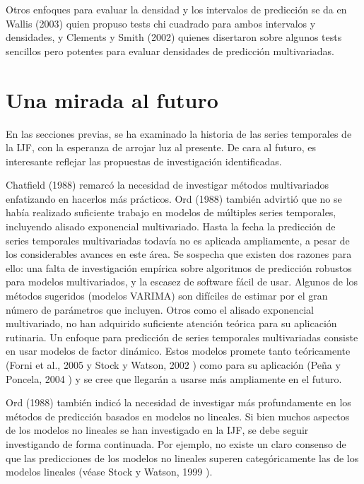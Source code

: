 \documentclass{llncs}
\begin{document}
Otros enfoques para evaluar la densidad y los intervalos de predicción se da en Wallis (2003) \cite{Wallis2003165} quien propuso tests chi cuadrado para ambos intervalos y densidades, y Clements y Smith (2002) quienes disertaron sobre algunos tests sencillos pero potentes para evaluar densidades de predicción multivariadas.

\section{Una mirada al futuro}
En las secciones previas, se ha examinado la historia de las series temporales de la IJF, con la esperanza de arrojar luz al presente. De cara al futuro, es interesante reflejar las propuestas de investigación identificadas. 

Chatfield (1988) \cite{Chatfield198819} remarcó la necesidad de investigar métodos multivariados enfatizando en hacerlos más prácticos. Ord (1988) \cite{Ord1988389} también advirtió que no se había realizado suficiente trabajo en modelos de múltiples series temporales, incluyendo alisado exponencial multivariado. Hasta la fecha la predicción de series temporales multivariadas todavía no es aplicada ampliamente, a pesar  de los considerables avances en este área. Se sospecha que existen dos razones para ello: una falta de investigación empírica sobre algoritmos de predicción robustos para modelos multivariados, y la escasez de software fácil de usar. Algunos de los métodos sugeridos (modelos VARIMA) son difíciles de estimar por el gran número de parámetros que incluyen. Otros como el alisado exponencial multivariado, no han adquirido suficiente atención teórica para su aplicación rutinaria. Un enfoque para predicción de series temporales multivariadas consiste en usar modelos de factor dinámico. Estos modelos promete tanto teóricamente (Forni et al., 2005 \cite{Forni2005830} y Stock y Watson, 2002 \cite{Stock20021167}) como para su aplicación (Peña y Poncela, 2004 \cite{Pena2004291}) y se cree que llegarán a usarse más ampliamente en el futuro.

Ord (1988) \cite{Ord1988389} también indicó la necesidad de investigar más profundamente en los métodos de predicción basados en modelos no lineales. Si bien muchos aspectos de los modelos no lineales se han investigado en la IJF, se debe seguir investigando de forma continuada. Por ejemplo, no existe un claro consenso de que las predicciones de los modelos no lineales superen categóricamente las de los modelos lineales (véase Stock y Watson, 1999 \cite{Stock19991}). 
\end{document}

